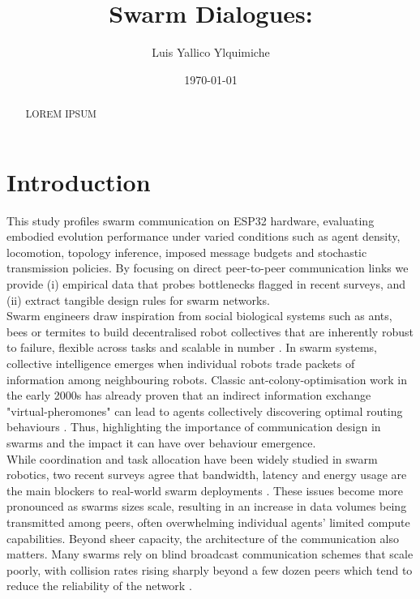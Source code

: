 \documentclass[conference]{IEEEtran}
\title{Swarm Dialogues: 
}
\author{Luis Yallico Ylquimiche}
\date{\today}
\begin{document}
\maketitle

\begin{abstract}
LOREM IPSUM
\end{abstract}


\section{Introduction}

This study profiles swarm communication on ESP32 hardware, evaluating embodied evolution performance under varied conditions such as agent density, locomotion, topology inference, imposed message budgets and stochastic transmission policies. By focusing on direct peer-to-peer communication links we provide (i) empirical data that probes bottlenecks flagged in recent surveys, and (ii) extract tangible design rules for swarm networks.\\

Swarm engineers draw inspiration from social biological systems such as ants, bees or termites to build decentralised robot collectives that are inherently robust to failure, flexible across tasks and scalable in number \cite{hamann_swarm_2018}. In swarm systems, collective intelligence emerges when individual robots trade packets of information among neighbouring robots. Classic ant-colony-optimisation work in the early 2000s has already proven that an indirect information exchange "virtual-pheromones" can lead to agents collectively discovering optimal routing behaviours \cite{dorigo_ant_2000}. Thus, highlighting the importance of communication design in swarms and the impact it can have over behaviour emergence.\\

While coordination and task allocation have been widely studied in swarm robotics, two recent surveys agree that bandwidth, latency and energy usage are the main blockers to real-world swarm deployments \cite{ding_advancements_2023}\cite{an_multi-robot_2023}. These issues become more pronounced as swarms sizes scale, resulting in an increase in data volumes being transmitted among peers, often overwhelming individual agents' limited compute capabilities. Beyond sheer capacity, the architecture of the communication also matters. Many swarms rely on blind broadcast communication schemes that scale poorly, with collision rates rising sharply beyond a few dozen peers which tend to reduce the reliability of the network \cite{an_multi-robot_2023}.\\
\end{document}
